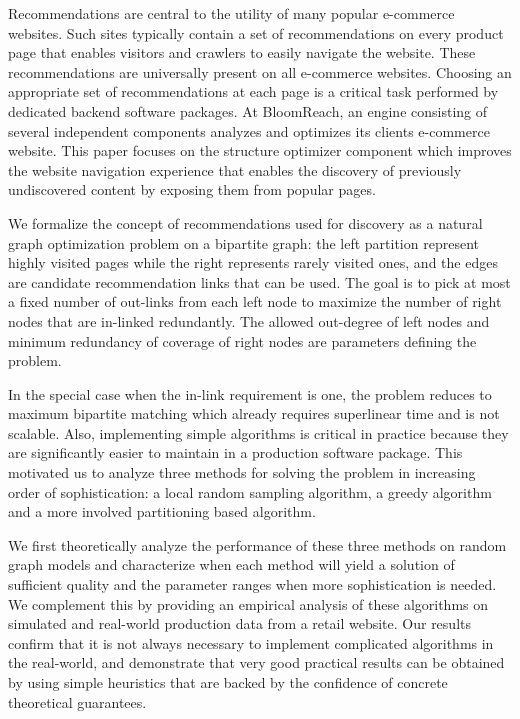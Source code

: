 \abstract


Recommendations are central to the utility of many popular e-commerce
websites. Such sites typically contain a set of recommendations on
every product page that enables visitors and crawlers to easily
navigate the website.  These recommendations are universally present
on all e-commerce websites. Choosing an appropriate set of recommendations
at each page is a critical task performed by dedicated backend
software packages.  At BloomReach, an engine consisting of several independent components
analyzes and optimizes its clients e-commerce website. This paper
focuses on the structure optimizer component which improves the
website navigation experience that enables the discovery of previously
undiscovered content by exposing them from popular pages.\vs


We formalize the concept of recommendations used for discovery as a natural graph optimization
problem on a bipartite graph: the left partition represent highly visited pages while the right 
represents rarely visited ones, and the edges are candidate recommendation links that can be used. 
The goal is to pick at most a fixed number of out-links from each left node to maximize the number of 
right nodes that are in-linked redundantly. The allowed out-degree of left nodes and minimum redundancy
 of coverage of right nodes are parameters defining the problem.

In the special case when the in-link requirement is one, the problem reduces to maximum bipartite 
matching which already requires superlinear time and is not scalable. Also, implementing simple
algorithms is critical in practice because they are significantly
easier to maintain in a production software package. This motivated us
to analyze three methods for solving the problem in increasing order
of sophistication: a local random sampling algorithm, a greedy algorithm
and a more involved partitioning based algorithm. \vs

We first theoretically analyze the performance of these three methods
on random graph models and characterize when each method will yield a
solution of sufficient quality and the parameter ranges when more
sophistication is needed. We complement this by providing an empirical
analysis of these algorithms on simulated and real-world production
data from a retail website. Our results confirm that it is not always necessary to implement  complicated algorithms in the real-world, and
demonstrate that very good practical results can be obtained by
using simple heuristics that are backed by the confidence of concrete
theoretical guarantees. \vs


